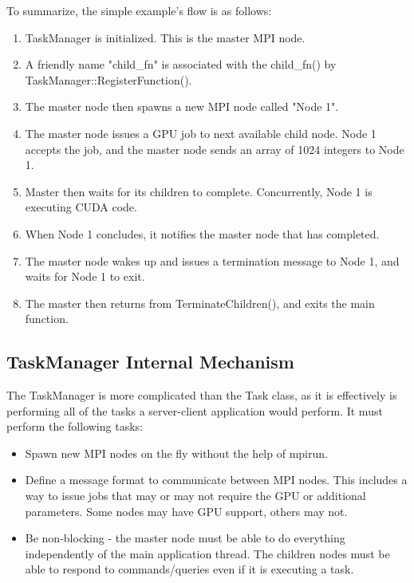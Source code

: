 \documentclass[11pt]{article}
\begin{document}
            To summarize, the simple example's flow is as follows:
            \begin{enumerate}
                \item TaskManager is initialized. This is the master MPI node.
                \item A friendly name "child\_fn" is associated with the child\_fn() by 
                TaskManager::RegisterFunction().
                \item The master node then spawns a new MPI node called "Node 1".
                \item The master node issues a GPU job to next available child node. Node 1 accepts
                    the job, and the master node sends an array of 1024 integers to Node 1.
                \item Master then waits for its children to complete. Concurrently, Node 1 is executing
                    CUDA code. 
                \item When Node 1 concludes, it notifies the master node that has completed.
                \item The master node wakes up and issues a termination message to Node 1, and waits for 
                    Node 1 to exit.
                \item The master then returns from TerminateChildren(), and exits the main function.
            \end{enumerate}
    
        \subsection{TaskManager Internal Mechanism}    
            The TaskManager is more complicated than the Task class, as it is effectively is performing
            all of the tasks a server-client application would perform. It must perform the following tasks:
                \begin{itemize}
                    \item Spawn new MPI nodes on the fly without the help of mpirun.
                    \item Define a message format to communicate between MPI nodes. This includes a way
                        to issue jobs that may or may not require the GPU or additional parameters. Some nodes
                        may have GPU support, others may not.
                    \item Be non-blocking - the master node must be able to do everything independently of the
                        main application thread. The children nodes must be able to respond to commands/queries
                        even if it is executing a task.
                \end{itemize}
            
\end{document}
